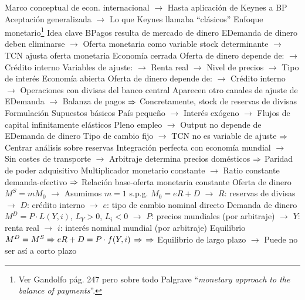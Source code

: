 \documentclass{nuevotema}
\begin{document}
\begin{esquemal}
				\4[] Marco conceptual de econ. internacional
				\4[] $\to$ Hasta aplicación de Keynes a BP
				\4[] Aceptación generalizada
				\4[] $\to$ Lo que Keynes llamaba ``clásicos''
		\2 Enfoque monetario\footnote{Ver Gandolfo pág. 247 pero sobre todo Palgrave ``\textit{monetary approach to the balance of payments}''.}
			\3 Idea clave
				\4 BPagos resulta de mercado de dinero
				\4[] EDemanda de dinero deben eliminarse
				\4[] $\to$ Oferta monetaria como variable stock determinante
				\4[] $\to$ TCN ajusta oferta monetaria
				\4 Economía cerrada
				\4[] Oferta de dinero depende de:
				\4[] $\to$ Crédito interno
				\4[] Variables de ajuste:
				\4[] $\to$ Renta real
				\4[] $\to$ Nivel de precios
				\4[] $\to$ Tipo de interés
				\4 Economía abierta
				\4[] Oferta de dinero depende de:
				\4[] $\to$ Crédito interno
				\4[] $\to$ Operaciones con divisas del banco central
				\4[] Aparecen otro canales de ajuste de EDemanda
				\4[] $\to$ Balanza de pagos
				\4[] $\Rightarrow$ Concretamente, stock de reservas de divisas
			\3 Formulación
				\4 Supuestos básicos
				\4[] País pequeño
				\4[] $\to$ Interés exógeno
				\4[] $\to$ Flujos de capital infinitamente elásticos
				\4[] Pleno empleo
				\4[] $\to$ Output no depende de EDemanda de dinero
				\4[] Tipo de cambio fijo
				\4[] $\to$ TCN no es variable de ajuste
				\4[] $\Rightarrow$ Centrar análisis sobre reservas
				\4[] Integración perfecta con economía mundial
				\4[] $\to$ Sin costes de transporte
				\4[] $\to$ Arbitraje determina precios domésticos
				\4[] $\Rightarrow$ Paridad de poder adquisitivo
				\4[] Multiplicador monetario constante
				\4[] $\to$ Ratio constante demanda-efectivo
				\4[] $\Rightarrow$ Relación base-oferta monetaria constante
				\4 Oferta de dinero
				\4[] $M^S = m M_0$
				\4[] $\to$ Asumimos $m=1$ s.p.g.
				\4[] $M_0 = eR + D$
				\4[] $\to$ $R$: reservas de divisas
				\4[] $\to$ $D$: crédito interno
				\4[] $\to$ $e$: tipo de cambio nominal directo
				\4 Demanda de dinero
				\4[] $M^D = P \cdot L(Y,i)$, $L_Y > 0$, $L_i<0$
				\4[] $\to$ $P$: precios mundiales (por arbitraje)
				\4[] $\to$ $Y$: renta real
				\4[] $\to$ $i$: interés nominal mundial (por arbitraje)
				\4 Equilibrio
				\4[] $M^D = M^S \Rightarrow eR + D = P \cdot f(Y,i)$
				\4[] $\Rightarrow$ 
				\4[] $\Rightarrow$ 
				\4[] Equilibrio de largo plazo
				\4[] $\to$ Puede no ser así a corto plazo

\end{esquemal}
\end{document}
